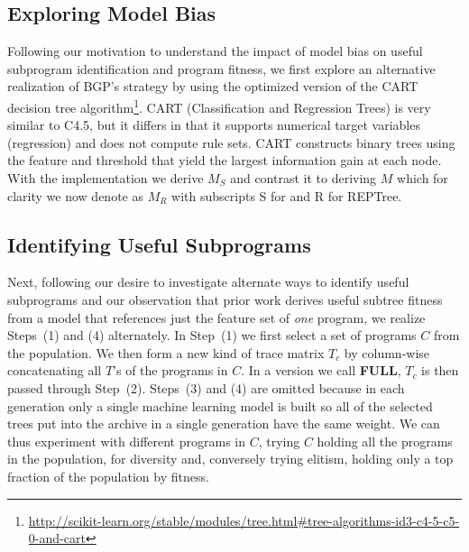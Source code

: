 \subsection{Exploring Model Bias}
Following our motivation to understand the impact of model bias on useful subprogram identification and program fitness, we first explore an alternative realization of BGP's strategy by using the \SCIKIT optimized version of the CART decision tree algorithm\footnote{\url{http://scikit-learn.org/stable/modules/tree.html\#tree-algorithms-id3-c4-5-c5-0-and-cart}}.  CART (Classification and Regression Trees) is very similar to C4.5, but it differs in that it supports numerical target variables (regression) and does not compute rule sets. CART constructs binary trees using the feature and threshold that yield the largest information gain at each node.  With the \SCIKIT implementation we derive $M_S$ and contrast it to deriving $M$ which for clarity we now denote as $M_R$ with subscripts S for \SCIKIT and R for REPTree. 

\subsection{Identifying Useful Subprograms}
\newcommand{\FULL}{\textbf{FULL}\xspace}
\newcommand{\DRAW}{\textbf{DRAW}\xspace}
Next, following our desire to investigate alternate ways to identify useful subprograms and our observation that prior work derives useful subtree fitness from a model that references just the feature set of \textit{one} program, we realize Steps~(1) and (4) alternately.  In Step~(1) we first select a set of programs  $C$ from the population. We then form a new kind of trace matrix $T_c$ by column-wise concatenating all $T${'s} of the programs in $C$. In a version we call \FULL,  $T_c$ is then passed through Step~(2). Steps~(3) and (4) are omitted because in each generation only a single machine learning model is built so all of the selected trees put into the archive in a single generation have the same weight.  We can thus experiment with different programs in $C$, trying $C$ holding all the programs in the population, for diversity and, conversely trying elitism, holding only a top fraction of the  population by fitness. 


